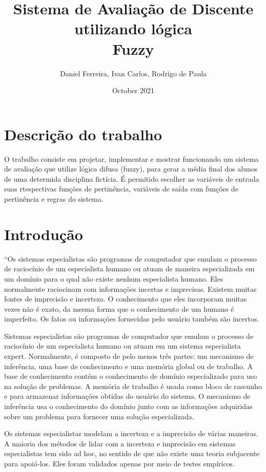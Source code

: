 \documentclass{article}
\title{%
  Sistema de Avaliação de Discente\\
  \large utilizando lógica\\
    Fuzzy}
\author{Daniel Ferreira, Ivan Carlos, Rodrigo de Paula}
\date{October 2021}
\begin{document}
\maketitle

\section{Descrição do trabalho}

O trabalho consiste em projetar, implementar e mostrar
funcionando um sistema de avaliação que utilize lógica difusa
(fuzzy), para gerar a média final dos alunos de uma determida
disciplina fictícia. É permitido escolher as variáveis de
entrada suas rtespectivas funções de pertinência, variáveis de
saída com funções de pertinência e regras do sistema.

\section{Introdução}

``Os sistemas especialistas são programas de computador que
emulam o processo de raciocínio de um especialista humano ou
atuam de maneira especializada em um domínio para o qual não
existe nenhum especialista humano. Eles normalmente raciocinam
com informações incertas e imprecisas. Existem muitas fontes
de imprecisão e incerteza. O conhecimento que eles incorporam
muitas vezes não é exato, da mesma forma que o conhecimento de
um humano é imperfeito. Os fatos ou informações fornecidas
pelo usuário também são incertos.

Sistemas especialistas são programas de computador que emulam
o processo de raciocínio de um especialista humano ou atuam
em um sistema especialista expert. Normalmente, é composto de
pelo menos três partes: um mecanismo de inferência, uma base
de conhecimento e uma memória global ou de trabalho. A base de
conhecimento contém o conhecimento de domínio especializado
para uso na solução de problemas. A memória de trabalho é
usada como bloco de rascunho e para armazenar informações
obtidas do usuário do sistema. O mecanismo de inferência usa o
conhecimento do domínio junto com as informações adquiridas
sobre um problema para fornecer uma solução especializada.

Os sistemas especialistas modelam a incerteza e a imprecisão
de várias maneiras. A maioria dos métodos de lidar com a
incerteza e imprecisão em sistemas especialistas tem sido ad
hoc, no sentido de que não existe uma teoria subjacente para
apoiá-los. Eles foram validados apenas por meio de testes
empíricos.
\end{document}
